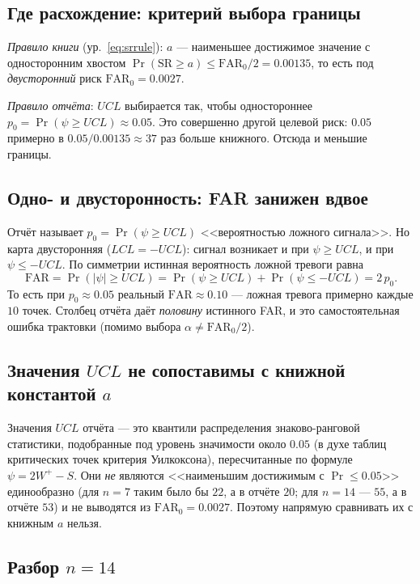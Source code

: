 \documentclass[11pt,a4paper]{article}
\newcommand{\SR}{\mathrm{SR}}
\newcommand{\FAR}{\mathrm{FAR}}
\newcommand{\FARz}{\FAR_0}
\begin{document}
\subsection{Где расхождение: критерий выбора границы}

\emph{Правило книги} (ур.~\eqref{eq:srrule}): $a$ --- наименьшее
достижимое значение с односторонним хвостом
$\Pr(\SR\ge a)\le\FARz/2=0.00135$, то есть под \emph{двусторонний}
риск $\FARz=0.0027$.

\emph{Правило отчёта}: $UCL$ выбирается так, чтобы одностороннее
$p_0=\Pr(\psi\ge UCL)\approx0.05$. Это совершенно другой целевой риск:
$0.05$ примерно в $0.05/0.00135\approx37$ раз больше книжного. Отсюда и
меньшие границы.

\subsection{Одно- и двусторонность: FAR занижен вдвое}

Отчёт называет $p_0=\Pr(\psi\ge UCL)$ <<вероятностью ложного
сигнала>>. Но карта двусторонняя ($LCL=-UCL$): сигнал возникает и при
$\psi\ge UCL$, и при $\psi\le -UCL$. По симметрии истинная вероятность
ложной тревоги равна
\begin{equation}
\FAR=\Pr(|\psi|\ge UCL)=\Pr(\psi\ge UCL)+\Pr(\psi\le -UCL)=2\,p_0 .
\end{equation}
То есть при $p_0\approx0.05$ реальный $\FAR\approx0.10$ --- ложная
тревога примерно каждые $10$ точек. Столбец отчёта даёт \emph{половину}
истинного FAR, и это самостоятельная ошибка трактовки (помимо выбора
$\alpha\ne\FARz/2$).

\subsection{Значения $UCL$ не сопоставимы с книжной константой $a$}

Значения $UCL$ отчёта --- это квантили распределения знаково-ранговой
статистики, подобранные под уровень значимости около $0.05$ (в духе
таблиц критических точек критерия Уилкоксона), пересчитанные по формуле
$\psi=2W^{+}-S$. Они \emph{не} являются <<наименьшим достижимым с
$\Pr\le0.05$>> единообразно (для $n=7$ таким было бы $22$, а в отчёте
$20$; для $n=14$ --- $55$, а в отчёте $53$) и не выводятся из
$\FARz=0.0027$. Поэтому напрямую сравнивать их с книжным $a$ нельзя.

\subsection{Разбор $n=14$}
\end{document}
